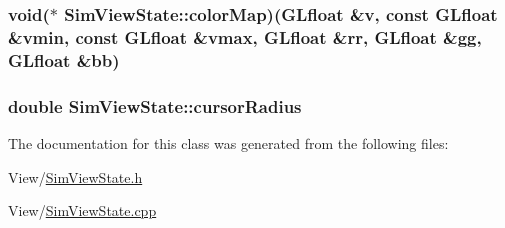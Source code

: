 \hypertarget{class_sim_view_state_ae589ccbf8ab7a064c2ea7d48d5c8bd24}{
\subsubsection[{color\+Map}]{\setlength{\rightskip}{0pt plus 5cm}void($\ast$ Sim\+View\+State\+::color\+Map)(G\+Lfloat \&v, const G\+Lfloat \&vmin, const G\+Lfloat \&vmax, G\+Lfloat \&rr, G\+Lfloat \&gg, G\+Lfloat \&bb)\hspace{0.3cm}{\ttfamily [protected]}}}\label{class_sim_view_state_ae589ccbf8ab7a064c2ea7d48d5c8bd24}
\hypertarget{class_sim_view_state_aa8c58229562ab48c746b601ee18c547f}{
\subsubsection[{cursor\+Radius}]{\setlength{\rightskip}{0pt plus 5cm}double Sim\+View\+State\+::cursor\+Radius\hspace{0.3cm}{\ttfamily [protected]}}}\label{class_sim_view_state_aa8c58229562ab48c746b601ee18c547f}


The documentation for this class was generated from the following files\+:\begin{DoxyCompactItemize}
\item 
View/\hyperlink{_sim_view_state_8h}{Sim\+View\+State.\+h}\item 
View/\hyperlink{_sim_view_state_8cpp}{Sim\+View\+State.\+cpp}\end{DoxyCompactItemize}
